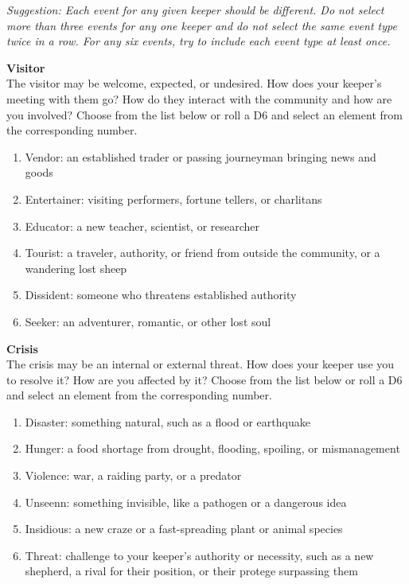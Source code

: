 \documentclass[
  a5paper,
]{article}
\providecommand{\tightlist}{%
  \setlength{\itemsep}{0pt}\setlength{\parskip}{0pt}}
\begin{document}
\emph{Suggestion: Each event for any given keeper should be different. Do not select more than three events for any one keeper and do not select the same event type twice in a row. For any six events, try to include each event type at least once.}

\textbf{Visitor}\\
The visitor may be welcome, expected, or undesired. How does your keeper's meeting with them go? How do they interact with the community and how are you involved? Choose from the list below or roll a D6 and select an element from the corresponding number.

\begin{enumerate}
\def\labelenumi{\arabic{enumi}.}
\tightlist
\item
  Vendor: an established trader or passing journeyman bringing news and goods
\item
  Entertainer: visiting performers, fortune tellers, or charlitans
\item
  Educator: a new teacher, scientist, or researcher
\item
  Tourist: a traveler, authority, or friend from outside the community, or a wandering lost sheep
\item
  Dissident: someone who threatens established authority
\item
  Seeker: an adventurer, romantic, or other lost soul
\end{enumerate}

\textbf{Crisis}\\
The crisis may be an internal or external threat. How does your keeper use you to resolve it? How are you affected by it? Choose from the list below or roll a D6 and select an element from the corresponding number.

\begin{enumerate}
\def\labelenumi{\arabic{enumi}.}
\tightlist
\item
  Disaster: something natural, such as a flood or earthquake
\item
  Hunger: a food shortage from drought, flooding, spoiling, or mismanagement
\item
  Violence: war, a raiding party, or a predator
\item
  Unseenn: something invisible, like a pathogen or a dangerous idea
\item
  Insidious: a new craze or a fast-spreading plant or animal species
\item
  Threat: challenge to your keeper's authority or necessity, such as a new shepherd, a rival for their position, or their protege surpassing them
\end{enumerate}
\end{document}

